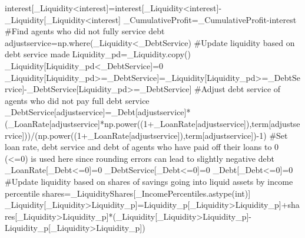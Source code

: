 \documentclass[
  letterpaper,
  DIV=11,
  numbers=noendperiod]{scrartcl}
\newenvironment{Shaded}{\begin{snugshade}}{\end{snugshade}}
\newcommand{\BuiltInTok}[1]{\textcolor[rgb]{0.00,0.23,0.31}{#1}}
\newcommand{\CommentTok}[1]{\textcolor[rgb]{0.37,0.37,0.37}{#1}}
\newcommand{\DecValTok}[1]{\textcolor[rgb]{0.68,0.00,0.00}{#1}}
\newcommand{\NormalTok}[1]{\textcolor[rgb]{0.00,0.23,0.31}{#1}}
\newcommand{\OperatorTok}[1]{\textcolor[rgb]{0.37,0.37,0.37}{#1}}
\begin{document}
\begin{Shaded}
\begin{Highlighting}[]
\NormalTok{    interest[\_Liquidity}\OperatorTok{\textless{}}\NormalTok{interest]}\OperatorTok{=}\NormalTok{interest[\_Liquidity}\OperatorTok{\textless{}}\NormalTok{interest]}\OperatorTok{{-}}\NormalTok{\_Liquidity[\_Liquidity}\OperatorTok{\textless{}}\NormalTok{interest]}
\NormalTok{    \_CumulativeProfit}\OperatorTok{=}\NormalTok{\_CumulativeProfit}\OperatorTok{{-}}\NormalTok{interest}
    \CommentTok{\#Find agents who did not fully service debt}
\NormalTok{    adjustservice}\OperatorTok{=}\NormalTok{np.where(\_Liquidity}\OperatorTok{\textless{}}\NormalTok{\_DebtService)}
     \CommentTok{\#Update liquidity based on debt service made}
\NormalTok{    Liquidity\_pd}\OperatorTok{=}\NormalTok{\_Liquidity.copy()}
\NormalTok{    \_Liquidity[Liquidity\_pd}\OperatorTok{\textless{}}\NormalTok{\_DebtService]}\OperatorTok{=}\DecValTok{0}
\NormalTok{    \_Liquidity[Liquidity\_pd}\OperatorTok{\textgreater{}=}\NormalTok{\_DebtService]}\OperatorTok{=}\NormalTok{\_Liquidity[Liquidity\_pd}\OperatorTok{\textgreater{}=}\NormalTok{\_DebtService]}\OperatorTok{{-}}\NormalTok{\_DebtService[Liquidity\_pd}\OperatorTok{\textgreater{}=}\NormalTok{\_DebtService]}
    \CommentTok{\#Adjust debt service of agents who did not pay full debt service}
\NormalTok{    \_DebtService[adjustservice]}\OperatorTok{=}\NormalTok{\_Debt[adjustservice]}\OperatorTok{*}\NormalTok{(\_LoanRate[adjustservice]}\OperatorTok{*}\NormalTok{np.power((}\DecValTok{1}\OperatorTok{+}\NormalTok{\_LoanRate[adjustservice]),term[adjustservice]))}\OperatorTok{/}\NormalTok{(np.power((}\DecValTok{1}\OperatorTok{+}\NormalTok{\_LoanRate[adjustservice]),term[adjustservice])}\OperatorTok{{-}}\DecValTok{1}\NormalTok{)}
     \CommentTok{\#Set loan rate, debt service and debt of agents who have paid off their loans to 0 (\textless{}=0) is used here since rounding errors can lead to slightly negative debt}
\NormalTok{    \_LoanRate[\_Debt}\OperatorTok{\textless{}=}\DecValTok{0}\NormalTok{]}\OperatorTok{=}\DecValTok{0}
\NormalTok{    \_DebtService[\_Debt}\OperatorTok{\textless{}=}\DecValTok{0}\NormalTok{]}\OperatorTok{=}\DecValTok{0}
\NormalTok{    \_Debt[\_Debt}\OperatorTok{\textless{}=}\DecValTok{0}\NormalTok{]}\OperatorTok{=}\DecValTok{0}
    \CommentTok{\#Update liquidity based on shares of savings going into liquid assets by income percentile}
\NormalTok{    shares}\OperatorTok{=}\NormalTok{\_LiquidityShares[\_IncomePercentiles.astype(}\BuiltInTok{int}\NormalTok{)]}
\NormalTok{    \_Liquidity[\_Liquidity}\OperatorTok{\textgreater{}}\NormalTok{Liquidity\_p]}\OperatorTok{=}\NormalTok{Liquidity\_p[\_Liquidity}\OperatorTok{\textgreater{}}\NormalTok{Liquidity\_p]}\OperatorTok{+}\NormalTok{shares[\_Liquidity}\OperatorTok{\textgreater{}}\NormalTok{Liquidity\_p]}\OperatorTok{*}\NormalTok{(\_Liquidity[\_Liquidity}\OperatorTok{\textgreater{}}\NormalTok{Liquidity\_p]}\OperatorTok{{-}}\NormalTok{Liquidity\_p[\_Liquidity}\OperatorTok{\textgreater{}}\NormalTok{Liquidity\_p])}
\end{Highlighting}
\end{Shaded}
\end{document}
